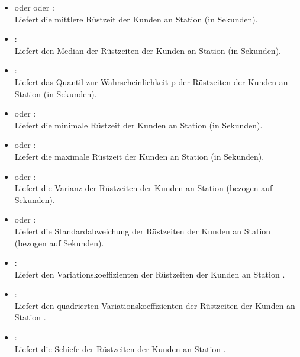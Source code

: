 \begin{itemize}

\item
{} oder  oder :\\
Liefert die mittlere Rüstzeit der Kunden an Station  (in Sekunden).

\item
{}:\\
Liefert den Median der Rüstzeiten der Kunden an Station  (in Sekunden).

\item
{}:\\
Liefert das Quantil zur Wahrscheinlichkeit p der Rüstzeiten der Kunden an Station  (in Sekunden).

\item
{} oder :\\  
Liefert die minimale Rüstzeit der Kunden an Station  (in Sekunden).

\item
{} oder :\\
Liefert die maximale Rüstzeit der Kunden an Station  (in Sekunden).

\item
{} oder :\\
Liefert die Varianz der Rüstzeiten der Kunden an Station  (bezogen auf Sekunden).

\item
{} oder :\\
Liefert die Standardabweichung der Rüstzeiten der Kunden an Station  (bezogen auf Sekunden).

\item
{}:\\
Liefert den Variationskoeffizienten der Rüstzeiten der Kunden an Station .

\item
{}:\\
Liefert den quadrierten Variationskoeffizienten der Rüstzeiten der Kunden an Station .

\item
{}:\\
Liefert die Schiefe der Rüstzeiten der Kunden an Station .


\end{itemize}
